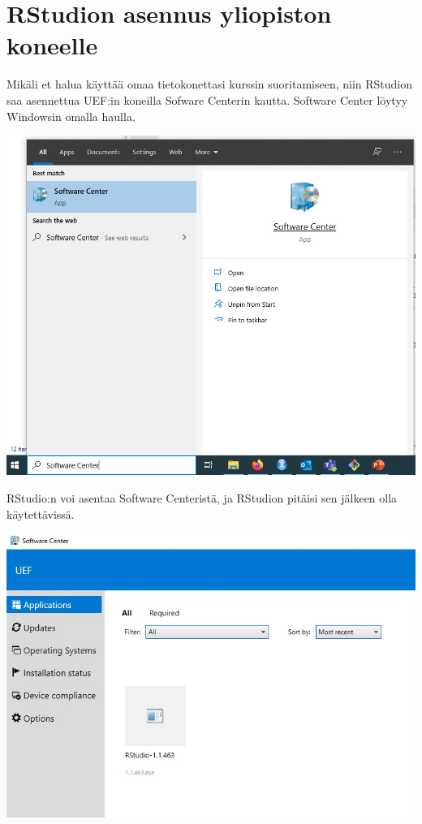 \documentclass[
]{book}
\begin{document}
\hypertarget{rstudion-asennus-yliopiston-koneelle}{%
\section*{RStudion asennus yliopiston koneelle}\label{rstudion-asennus-yliopiston-koneelle}}

Mikäli et halua käyttää omaa tietokonettasi kurssin suoritamiseen, niin RStudion saa asennettua UEF:in koneilla Sofware Centerin kautta. Software Center löytyy Windowsin omalla haulla.

\includegraphics{files/00-start/software_center.jpg}

RStudio:n voi asentaa Software Centeristä, ja RStudion pitäisi sen jälkeen olla käytettävissä.

\includegraphics{files/00-start/RStudio_sc.jpg}
\end{document}
